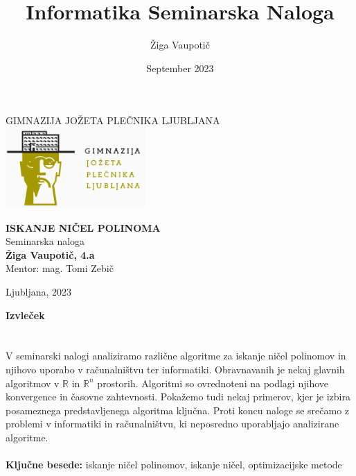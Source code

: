 \documentclass[a4paper,12pt,openright, oneside]{book}
\title{Informatika Seminarska Naloga}
\author{Žiga Vaupotič}
\date{September 2023}
\renewenvironment{abstract}
 {\par\noindent \hfill \textbf{Izvleček}  \hfill\ \ignorespaces \\}
 {\par\medskip \medskip}
\newcommand{\R}{\mathbb{R}}
\begin{document}
\begin{titlepage}
   \begin{center}
        \large {GIMNAZIJA JOŽETA PLEČNIKA LJUBLJANA} \\
        \vspace{1 cm}
       \includegraphics[width=0.4\textwidth]{img/logo.png}
            
       \vspace{3cm}
       \textbf{\Large ISKANJE NIČEL POLINOMA}\\
       \vspace{0.5 cm}
        \large {Seminarska naloga}\\
        \vspace{ 1 cm}
        \large \textbf{Žiga Vaupotič, 4.a}\\
        \vspace{ 7 cm}
         {Mentor: } mag. Tomi Zebič
           \vfill  

    Ljubljana, 2023
   \end{center}
\end{titlepage}
\begin{abstract}
\\\\
V seminarski nalogi analiziramo različne algoritme za iskanje ničel polinomov in njihovo uporabo v računalništvu ter informatiki. Obravnavanih je nekaj glavnih algoritmov v $\R$ in $\R^n$ prostorih. Algoritmi so ovrednoteni na podlagi njihove konvergence in časovne zahtevnosti. Pokažemo tudi nekaj primerov, kjer je izbira posameznega predstavljenega algoritma ključna. Proti koncu naloge se srečamo z problemi v informatiki in računalništvu, ki neposredno uporabljajo analizirane algoritme.
\\\\
    \small{\textbf{Ključne besede: }iskanje ničel polinomov, iskanje ničel, optimizacijske metode}
\end{abstract}

\newpage
\tableofcontents
\newpage
\listoffigures
\newpage

\newpage


\newpage

\newpage

\newpage

\newpage


\newpage

\end{document}
